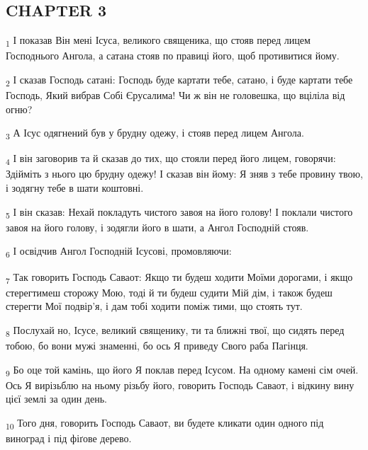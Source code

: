\subsection{CHAPTER 3}
\begin{tcolorbox}
\textsubscript{1} І показав Він мені Ісуса, великого священика, що стояв перед лицем Господнього Ангола, а сатана стояв по правиці його, щоб противитися йому.
\end{tcolorbox}
\begin{tcolorbox}
\textsubscript{2} І сказав Господь сатані: Господь буде картати тебе, сатано, і буде картати тебе Господь, Який вибрав Собі Єрусалима! Чи ж він не головешка, що вціліла від огню?
\end{tcolorbox}
\begin{tcolorbox}
\textsubscript{3} А Ісус одягнений був у брудну одежу, і стояв перед лицем Ангола.
\end{tcolorbox}
\begin{tcolorbox}
\textsubscript{4} І він заговорив та й сказав до тих, що стояли перед його лицем, говорячи: Здійміть з нього цю брудну одежу! І сказав він йому: Я зняв з тебе провину твою, і зодягну тебе в шати коштовні.
\end{tcolorbox}
\begin{tcolorbox}
\textsubscript{5} І він сказав: Нехай покладуть чистого завоя на його голову! І поклали чистого завоя на його голову, і зодягли його в шати, а Ангол Господній стояв.
\end{tcolorbox}
\begin{tcolorbox}
\textsubscript{6} І освідчив Ангол Господній Ісусові, промовляючи:
\end{tcolorbox}
\begin{tcolorbox}
\textsubscript{7} Так говорить Господь Саваот: Якщо ти будеш ходити Моїми дорогами, і якщо стерегтимеш сторожу Мою, тоді й ти будеш судити Мій дім, і також будеш стерегти Мої подвір'я, і дам тобі ходити поміж тими, що стоять тут.
\end{tcolorbox}
\begin{tcolorbox}
\textsubscript{8} Послухай но, Ісусе, великий священику, ти та ближні твої, що сидять перед тобою, бо вони мужі знаменні, бо ось Я приведу Свого раба Пагінця.
\end{tcolorbox}
\begin{tcolorbox}
\textsubscript{9} Бо оце той камінь, що його Я поклав перед Ісусом. На одному камені сім очей. Ось Я вирізьблю на ньому різьбу його, говорить Господь Саваот, і відкину вину цієї землі за один день.
\end{tcolorbox}
\begin{tcolorbox}
\textsubscript{10} Того дня, говорить Господь Саваот, ви будете кликати один одного під виноград і під фіґове дерево.
\end{tcolorbox}
